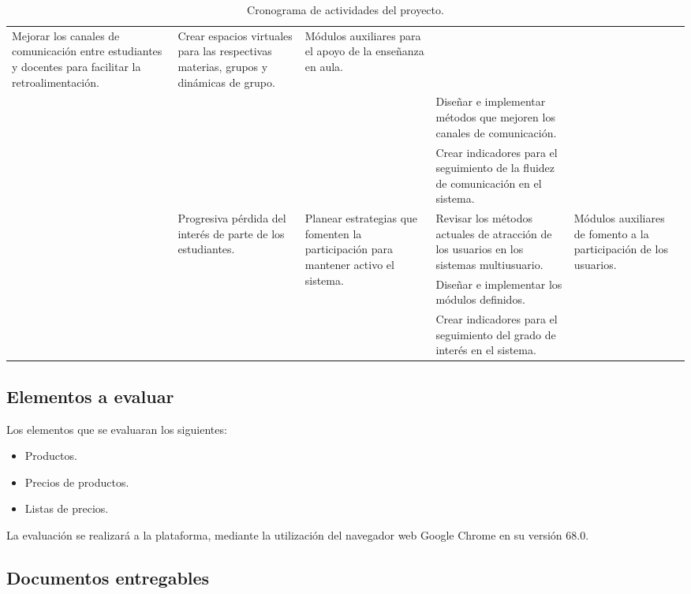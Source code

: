 \begin{sidewaystable}
\begin{tabular}{|l|l|l|p{6.5cm}|l|}
\multirow{3}{3.5cm}{Mejorar los canales de comunicación entre estudiantes y docentes para facilitar
la retroalimentación.} &
Crear espacios virtuales para las respectivas materias, grupos y dinámicas de grupo. &
\multirow{3}{2.5cm}{Módulos auxiliares para el apoyo de la enseñanza en aula.} \\
\cline{4-4}
& & & Diseñar e implementar métodos que mejoren los canales de comunicación. & \\
\cline{4-4}
& & & Crear indicadores para el seguimiento de la fluidez de comunicación en el sistema. & \\
\cline{2-5}
& \multirow{3}{3cm}{Progresiva pérdida del interés de parte de los estudiantes.} &
\multirow{3}{3.5cm}{Planear estrategias que fomenten la participación para mantener activo el sistema.} &
Revisar los métodos actuales de atracción de los usuarios en los sistemas multiusuario. &
\multirow{3}{2.5cm}{Módulos auxiliares de fomento a la participación de los usuarios.} \\
\cline{4-4}
& & & Diseñar e implementar los módulos definidos. & \\
\cline{4-4}
& & & Crear indicadores para el seguimiento del grado de interés en el sistema. & \\
\hline
\end{tabular}
\caption{Cronograma de actividades del proyecto.}
\label{cronograma}
\end{sidewaystable}

\subsection{Elementos a evaluar}
Los elementos que se evaluaran los siguientes:

\begin{itemize}
\item Productos.
\item Precios de productos.
\item Listas de precios.
\end{itemize}

La evaluación se realizará a la plataforma, mediante la utilización del navegador
web Google Chrome en su versión 68.0.

\subsection{Documentos entregables}


